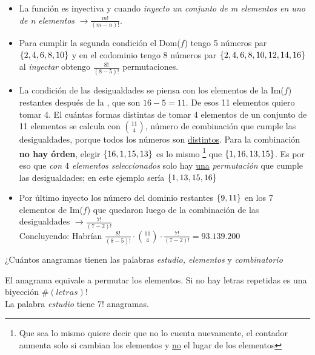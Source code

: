\begin{itemize}
	\item
	      La función es inyectiva y cuando \textit{inyecto un conjunto de m elementos en uno de n elementos } $\to \frac{m!}{(m-n)!}$.

	\item
	      Para cumplir la segunda condición el Dom($f$) tengo 5 números par $\left\{ 2,4,6,8,10 \right\}$ y en el codominio tengo 8 números par
	      $\set{\foreach \i in {2,4,...,14}{\i,}16}$ al \textit{inyectar} obtengo $\frac{8!}{(8-5)!}$ permutaciones.

	\item
	      La condición de las desigualdades se piensa con los elementos de la Im($f$) restantes después de la , que son $16 - 5 = 11$.
	      De esos 11 elementos quiero tomar 4. El cuántas formas distintas de tomar 4 elementos de un conjunto de 11 elementos se calcula con $\binom{11}{4}$,
	      número de combinación que cumple las desigualdades, porque todos los números son \underline{distintos}. Para la combinación
	      \textbf{no hay órden}, elegir $\left\{ 16,1,15,13 \right\}$ es lo mismo
	      \footnote{Que sea lo mismo quiere decir que no lo cuenta nuevamente, el contador aumenta solo si cambian los
		      elementos y \underline{no} el lugar de los elementos}
	      que $\left\{ 1,16,13,15 \right\}$. Es por eso que \textit{con $4$ elementos seleccionados}
	      solo hay \underline{una} \textit{permutación} que cumple las desigualdades; en este ejemplo sería $\left\{ 1,13,15,16 \right\}$

	\item
	      Por último inyecto los número del dominio restantes $\left\{ 9,11 \right\}$ en los 7 elementos de Im($f$) que quedaron luego de la combinación de las
	      desigualdades $\to \frac{7!}{(7-2)!}$\\

	      Concluyendo: Habrían $\frac{8!}{(8-5)!} \cdot \binom{11}{4} \cdot \frac{7!}{(7-2)!} = 93.139.200$\\
\end{itemize}


\ejercicio
¿Cuántos anagramas tienen las palabras \textit{estudio, elementos} y \textit{combinatorio}\\
\separadorCorto

El anagrama equivale a permutar los elementos. Si no hay letras repetidas es una biyección $\#(letras)!$\\
La palabra \textit{estudio} tiene $7!$ anagramas.\\


